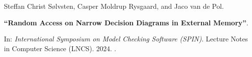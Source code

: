Steffan Christ Sølvsten, Casper Moldrup Rysgaard, and Jaco van de Pol.

{\bf ``Random Access on Narrow Decision Diagrams in External Memory''}.

In: \emph{International Symposium on Model Checking Software (SPIN)}.
Lecture Notes in Computer Science (LNCS). 2024.
.

\label{cite:2024.spin}